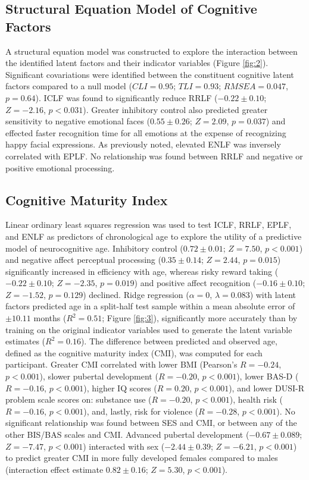 \documentclass{article}%
\begin{document}
\subsection*{Structural Equation Model of Cognitive Factors} A structural equation model was constructed to explore the interaction between the identified latent factors and their indicator variables (Figure \ref{fig:2}). Significant covariations were identified between the constituent cognitive latent factors compared to a null model ($CLI = 0.95$; $TLI = 0.93$; $RMSEA = 0.047$, $p = 0.64$). ICLF was found to significantly reduce RRLF ($-0.22\pm0.10$; $Z=-2.16$, $p<0.031$). Greater inhibitory control also predicted greater sensitivity to negative emotional faces ($0.55\pm0.26$; $Z=2.09$, $p = 0.037$) and effected faster recognition time for all emotions at the expense of recognizing happy facial expressions. As previously noted, elevated ENLF was inversely correlated with EPLF. No relationship was found between RRLF and negative or positive emotional processing.
\subsection*{Cognitive Maturity Index} Linear ordinary least squares regression was used to test ICLF, RRLF, EPLF, and ENLF as predictors of chronological age to explore the utility of a predictive model of neurocognitive age. Inhibitory control ($0.72\pm0.01$; $Z=7.50$, $p<0.001$) and negative affect perceptual processing ($0.35\pm0.14$; $Z=2.44$, $p=0.015$) significantly increased in efficiency with age, whereas risky reward taking ($-0.22\pm0.10$; $Z=-2.35$, $p = 0.019$) and positive affect recognition ($-0.16\pm0.10$; $Z=-1.52$, $p=0.129$) declined. Ridge regression ($\alpha = 0$, $\lambda = 0.083$) with latent factors predicted age in a split-half test sample within a mean absolute error of $\pm 10.11$ months ($R^2=0.51$; Figure \ref{fig:3}), significantly more accurately than by training on the original indicator variables used to generate the latent variable estimates ($R^2=0.16$). The difference between predicted and observed age, defined as the cognitive maturity index (CMI), was computed for each participant. Greater CMI correlated with lower BMI (Pearson's $R=-0.24$, $p<0.001$), slower pubertal development ($R=-0.20$, $p<0.001$), lower BAS-D ($R=-0.16$, $p<0.001$), higher IQ scores ($R=0.20$, $p<0.001$), and lower DUSI-R problem scale scores on: substance use ($R=-0.20$, $p<0.001$), health risk ($R=-0.16$, $p<0.001$), and, lastly, risk for violence ($R=-0.28$, $p<0.001$). No significant relationship was found between SES and CMI, or between any of the other BIS/BAS scales and CMI. Advanced pubertal development ($-0.67\pm0.089$; $Z=-7.47$, $p<0.001$) interacted with sex ($-2.44\pm0.39$; $Z=-6.21$, $p<0.001$) to predict greater CMI in more fully developed females compared to males (interaction effect estimate $0.82\pm0.16$; $Z=5.30$, $p<0.001$).
%
\end{document}
